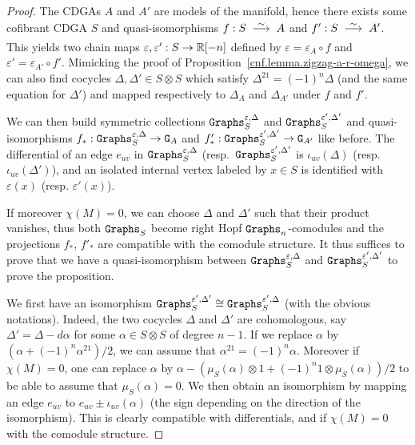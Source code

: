 \begin{proof}
  The CDGAs $A$ and $A'$ are models of the manifold, hence there exists some cofibrant CDGA $S$ and quasi-isomorphisms $f : S \qiso A$ and $f' : S \qiso A'$.
  This yields two chain maps $\varepsilon, \varepsilon' : S \to \mathbb{R}[-n]$ defined by $\varepsilon = \varepsilon_{A} \circ f$ and $\varepsilon' = \varepsilon_{A'} \circ f'$.
  Mimicking the proof of Proposition~\ref{cnf.lemma.zigzag-a-r-omega}, we can also find cocycles $\Delta, \Delta' \in S \otimes S$ which satisfy $\Delta^{21} = (-1)^{n} \Delta$ (and the same equation for $\Delta'$) and mapped respectively to $\Delta_{A}$ and $\Delta_{A'}$ under $f$ and $f'$.

  We can then build symmetric collections $\mathtt{Graphs}_{S}^{\varepsilon, \Delta}$ and $\mathtt{Graphs}_{S}^{\varepsilon', \Delta'}$ and quasi-isomorphisms $f_{*} : \mathtt{Graphs}_{S}^{\varepsilon, \Delta} \to \mathtt{G}_{A}$ and $f'_{*} : \mathtt{Graphs}_{S}^{\varepsilon', \Delta'} \to \mathtt{G}_{A'}$ like before.
  The differential of an edge $e_{uv}$ in $\mathtt{Graphs}_{S}^{\varepsilon,\Delta}$ (resp.\ $\mathtt{Graphs}_{S}^{\varepsilon',\Delta'}$ is $\iota_{uv}(\Delta)$ (resp.\ $\iota_{uv}(\Delta')$), and an isolated internal vertex labeled by $x \in S$ is identified with $\varepsilon(x)$ (resp. $\varepsilon'(x)$).

  If moreover $\chi(M) = 0$, we can choose $\Delta$ and $\Delta'$ such that their product vanishes, thus both $\mathtt{Graphs}_{S}$ become right Hopf $\mathtt{Graphs}_{n}$-comodules and the projections $f_{*}$, $f'_{*}$ are compatible with the comodule structure.
  It thus suffices to prove that we have a quasi-isomorphism between $\mathtt{Graphs}_{S}^{\varepsilon,\Delta}$ and $\mathtt{Graphs}_{S}^{\varepsilon',\Delta'}$ to prove the proposition.

  We first have an isomorphism $\mathtt{Graphs}_{S}^{\varepsilon',\Delta'} \cong \mathtt{Graphs}_{S}^{\varepsilon',\Delta}$ (with the obvious notations).
  Indeed, the two cocycles $\Delta$ and $\Delta'$ are cohomologous, say $\Delta' = \Delta - d\alpha$ for some $\alpha \in S \otimes S$ of degree $n-1$.
  If we replace $\alpha$ by $(\alpha + (-1)^{n} \alpha^{21})/2$, we can assume that $\alpha^{21} = (-1)^{n} \alpha$.
  Moreover if $\chi(M) = 0$, one can replace $\alpha$ by $\alpha - (\mu_{S}(\alpha) \otimes 1 + (-1)^{n} 1 \otimes \mu_{S}(\alpha))/2$ to be able to assume that $\mu_{S}(\alpha) = 0$.
  We then obtain an isomorphism by mapping an edge $e_{uv}$ to $e_{uv} \pm \iota_{uv}(\alpha)$ (the sign depending on the direction of the isomorphism).
  This is clearly compatible with differentials, and if $\chi(M) = 0$ with the comodule structure.


\end{proof}
